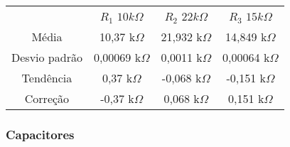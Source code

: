 \documentclass[12pt,twoside, a4paper, twocolumn]{article}
\begin{document}
\begin{center}
    \begin{tabular}{ |c|c|c|c| }
        \hline
                      & $R_1$ $10k\varOmega$ & $R_2$ $22k\varOmega$ & $R_3$ $15k\varOmega$ \\
        Média         & 10,37 k$\varOmega$   & 21,932 k$\varOmega$  & 14,849 k$\varOmega$ \\
        Desvio padrão & 0,00069 k$\varOmega$ & 0,0011 k$\varOmega$ & 0,00064 k$\varOmega$ \\
        Tendência     & 0,37 k$\varOmega$    & -0,068 k$\varOmega$ & -0,151 k$\varOmega$ \\
        Correção      & -0,37 k$\varOmega$   & 0,068 k$\varOmega$ & 0,151 k$\varOmega$ \\


        \hline
    \end{tabular}
\end{center}

\subsubsection{Capacitores}
\end{document}
